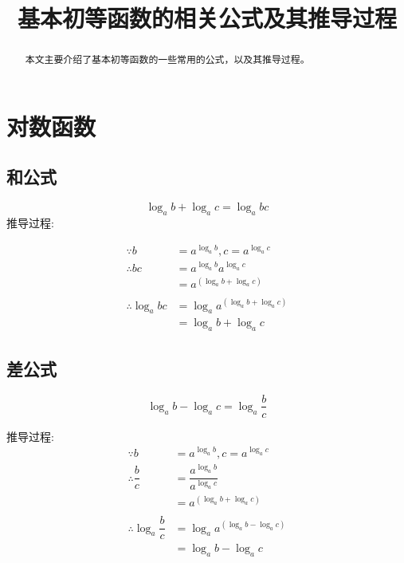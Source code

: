 \documentclass[a4paper, 12pt, draft]{article}
\title{基本初等函数的相关公式及其推导过程}
\author{}
\date{}
\begin{document}
\maketitle
\tableofcontents

\begin{abstract}
    本文主要介绍了基本初等函数的一些常用的公式，以及其推导过程。
\end{abstract}

\newpage
\section{对数函数}
    \subsection{和公式}
    \begin{equation}\label{eq1.1}
        \log_a{b} + \log_a{c} = \log_a{bc}
    \end{equation}
    推导过程:

    $$
    \begin{aligned}
        \because   b  &= a^{\log_{a}{b}}, c = a^{\log_{a}{c}}   \\
        \therefore bc &= a^{\log_{a}{b}} a^{\log_{a}{c}}        \\
                      &= a^{(\log_{a}{b} + \log_{a}{c})}        \\
                                                                &\\
        \therefore \log_{a}{bc} &= \log_{a}{a^{(\log_{a}{b} + \log_{a}{c})}} \\
                                &= \log_{a}{b} + \log_{a}{c}
    \end{aligned}
    $$

    \subsection{差公式}
    \begin{equation}\label{eq1.2}
        \log_{a}{b} - \log_{a}{c} = \log_{a}{ \dfrac{b}{c} }
    \end{equation}
    
    推导过程:
    $$
    \begin{aligned}
        \because   b            &= a^{\log_{a}{b}}, c = a^{\log_{a}{c}}     \\
        \therefore \dfrac{b}{c}  &= \dfrac{a^{\log_{a}{b}}}{a^{\log_{a}{c}}}  \\
                                &= a^{(\log_{a}{b} + \log_{a}{c})}          \\
                                &                                           \\
        \therefore \log_{a}{\dfrac{b}{c}} &= \log_{ a }{ a ^ {(\log_{a}{b}-\log_{a}{c})} } \\
                                &= \log_{a}{b} - \log_{a}{c}
    \end{aligned}
    $$
\end{document}
